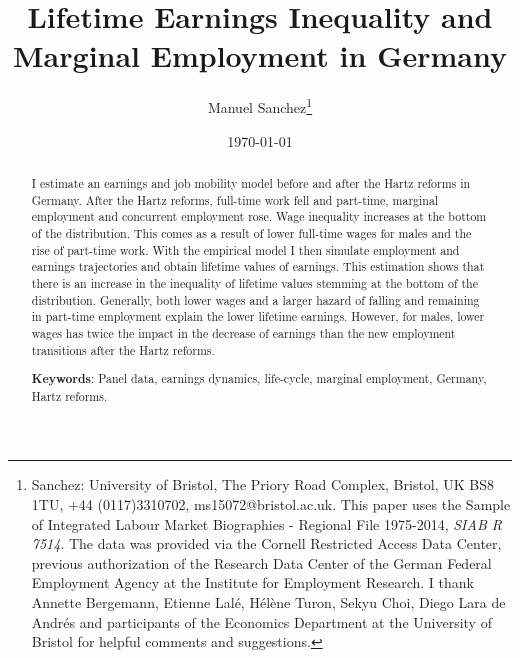 \documentclass[12pt, a4paper]{article}
\begin{document}
\date{\today}
\begin{titlepage}


\title{\textbf{Lifetime Earnings Inequality and Marginal Employment in Germany}}

\author{Manuel Sanchez\thanks{
Sanchez: University of Bristol, The Priory Road Complex, Bristol, UK BS8 1TU, +44 (0117)3310702, ms15072@bristol.ac.uk. This paper uses the Sample of Integrated Labour Market Biographies - Regional File 1975-2014, \textit{SIAB R 7514}. The data was provided via the Cornell Restricted Access Data Center, previous authorization of the Research Data Center of the German Federal Employment Agency at the Institute for Employment Research. I thank Annette Bergemann, Etienne Lal\'{e}, H\'{e}l\`{e}ne Turon, Sekyu Choi, Diego Lara de Andr\'{e}s and participants of the Economics Department at the University of Bristol for helpful comments and suggestions.}}
\maketitle

\vspace{-0.5 cm}
\begin{abstract}
\vspace{+0.5 cm}
\noindent
I estimate an earnings and job mobility model before and after the Hartz reforms in Germany. After the Hartz reforms, full-time work fell and part-time, marginal employment and concurrent employment rose. Wage inequality increases at the bottom of the distribution. This comes as a result of lower full-time wages for males and the rise of part-time work. With the empirical model I then simulate employment and earnings trajectories and obtain lifetime values of earnings. This estimation shows that there is an increase in the inequality of lifetime values stemming at the bottom of the distribution. Generally, both lower wages and a larger hazard of falling and remaining in part-time employment explain the lower lifetime earnings. However, for males, lower wages has twice the impact in the decrease of earnings than the new employment transitions after the Hartz reforms.

\vspace{+0.5 cm}
\textbf{Keywords}: Panel data, earnings dynamics, life-cycle, marginal employment, Germany, Hartz reforms.\\
\end{abstract}

\thispagestyle{empty}
\end{titlepage}
\end{document}
